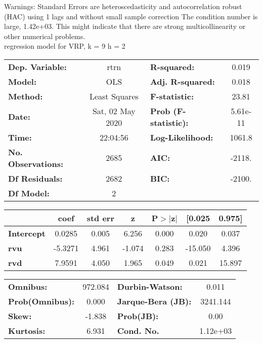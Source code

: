 Warnings: \newline
 [1] Standard Errors are heteroscedasticity and autocorrelation robust (HAC) using 1 lags and without small sample correction \newline
 [2] The condition number is large, 1.42e+03. This might indicate that there are \newline
 strong multicollinearity or other numerical problems.\\ 

regression model for VRP, k = 9 h = 2\begin{center}
\begin{tabular}{lclc}
\toprule
\textbf{Dep. Variable:}    &       rtrn       & \textbf{  R-squared:         } &     0.019   \\
\textbf{Model:}            &       OLS        & \textbf{  Adj. R-squared:    } &     0.018   \\
\textbf{Method:}           &  Least Squares   & \textbf{  F-statistic:       } &     23.81   \\
\textbf{Date:}             & Sat, 02 May 2020 & \textbf{  Prob (F-statistic):} &  5.61e-11   \\
\textbf{Time:}             &     22:04:56     & \textbf{  Log-Likelihood:    } &    1061.8   \\
\textbf{No. Observations:} &        2685      & \textbf{  AIC:               } &    -2118.   \\
\textbf{Df Residuals:}     &        2682      & \textbf{  BIC:               } &    -2100.   \\
\textbf{Df Model:}         &           2      & \textbf{                     } &             \\
\bottomrule
\end{tabular}
\begin{tabular}{lcccccc}
                   & \textbf{coef} & \textbf{std err} & \textbf{z} & \textbf{P$> |$z$|$} & \textbf{[0.025} & \textbf{0.975]}  \\
\midrule
\textbf{Intercept} &       0.0285  &        0.005     &     6.256  &         0.000        &        0.020    &        0.037     \\
\textbf{rvu}       &      -5.3271  &        4.961     &    -1.074  &         0.283        &      -15.050    &        4.396     \\
\textbf{rvd}       &       7.9591  &        4.050     &     1.965  &         0.049        &        0.021    &       15.897     \\
\bottomrule
\end{tabular}
\begin{tabular}{lclc}
\textbf{Omnibus:}       & 972.084 & \textbf{  Durbin-Watson:     } &    0.011  \\
\textbf{Prob(Omnibus):} &   0.000 & \textbf{  Jarque-Bera (JB):  } & 3241.144  \\
\textbf{Skew:}          &  -1.838 & \textbf{  Prob(JB):          } &     0.00  \\
\textbf{Kurtosis:}      &   6.931 & \textbf{  Cond. No.          } & 1.12e+03  \\
\bottomrule
\end{tabular}
\end{center}

